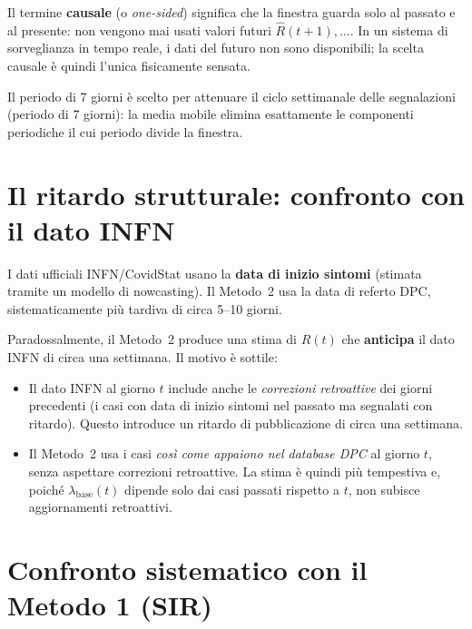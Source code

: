 \documentclass[12pt,a4paper]{article}
\newcommand{\lbase}{\lambda_{\mathrm{base}}}
\begin{document}
Il termine \textbf{causale} (o \emph{one-sided}) significa che la finestra guarda
solo al passato e al presente: non vengono mai usati valori futuri $\widehat{R}(t+1), \ldots$.
In un sistema di sorveglianza in tempo reale, i dati del futuro non sono disponibili;
la scelta causale è quindi l'unica fisicamente sensata.

Il periodo di 7 giorni è scelto per attenuare il ciclo settimanale delle segnalazioni
(periodo di 7 giorni): la media mobile elimina esattamente le componenti periodiche
il cui periodo divide la finestra.

\section{Il ritardo strutturale: confronto con il dato INFN}

I dati ufficiali INFN/CovidStat usano la \textbf{data di inizio sintomi} (stimata tramite
un modello di nowcasting). Il Metodo~2 usa la data di referto DPC, sistematicamente
più tardiva di circa 5--10 giorni.

Paradossalmente, il Metodo~2 produce una stima di $R(t)$ che \textbf{anticipa} il dato
INFN di circa una settimana. Il motivo è sottile:

\begin{itemize}
  \item Il dato INFN al giorno $t$ include anche le \emph{correzioni retroattive} dei
        giorni precedenti (i casi con data di inizio sintomi nel passato ma segnalati
        con ritardo). Questo introduce un ritardo di pubblicazione di circa una settimana.
  \item Il Metodo~2 usa i casi \emph{così come appaiono nel database DPC} al giorno $t$,
        senza aspettare correzioni retroattive. La stima è quindi più tempestiva e, poiché
        $\lbase(t)$ dipende solo dai casi passati rispetto a $t$, non subisce aggiornamenti
        retroattivi.
\end{itemize}

\section{Confronto sistematico con il Metodo 1 (SIR)}
\end{document}
